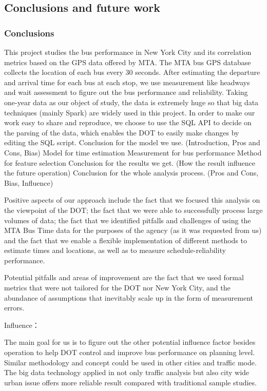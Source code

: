 \documentclass[12pt]{report}
\begin{document}
\subsection{Conclusions and future work}

\subsubsection*{Conclusions}


This project studies the bus performance in New York City and its correlation metrics based on the GPS data offered by MTA. The MTA bus GPS database collects the location of each bus every 30 seconds. After estimating the departure and arrival time for each bus at each stop, we use measurement like headways and wait assessment to figure out the bus performance and reliability. Taking one-year data as our object of study, the data is extremely huge so that big data techniques (mainly Spark) are widely used in this project. In order to make our work easy to share and reproduce, we choose to use the SQL API to decide on the parsing of the data, which enables the DOT to easily make changes by editing the SQL script. 
Conclusion for the model we use. (Introduction, Pros and Cons, Bias)
Model for time estimation
Measurement for bus performance
Method for feature selection
Conclusion for the results we get. (How the result influence the future operation)
Conclusion for the whole analysis process. (Pros and Cons, Bias, Influence)


Positive aspects of our approach include the fact that we focused this analysis on the viewpoint of the DOT; the fact that we were able to successfully process large volumes of data; the fact that we identified pitfalls and challenges of using the MTA Bus Time data for the purposes of the agency (as it was requested from us) and the fact that we enable a flexible implementation of different methods to estimate times and locations, as well as to measure schedule-reliability performance.

Potential pitfalls and areas of improvement are the fact that we used formal metrics that were not tailored for the DOT nor New York City, and the abundance of assumptions that inevitably scale up in the form of measurement errors.

Influence：

The main goal for us is to figure out the other potential influence factor besides operation to help DOT control and improve bus performance on planning level. Similar methodology and concept could be used in other cities and traffic mode. The big data technology applied in not only traffic analysis but also city wide urban issue offers more reliable result compared with traditional sample studies.  
\end{document}
